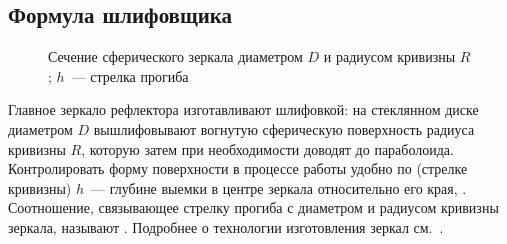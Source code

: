 \subsection{Формула шлифовщика}
\label{sec:grinder-formula}

\begin{figure}
    \centering
    \vspace{-1pc}
    \caption{Сечение сферического зеркала диаметром $D$ и радиусом кривизны $R$; $h$~--- стрелка прогиба}
    \label{pic:mirror-sagitta}
\end{figure}
Главное зеркало рефлектора изготавливают шлифовкой: на стеклянном диске диаметром $D$ вышлифовывают вогнутую сферическую поверхность радиуса кривизны $R$, которую затем при необходимости доводят до параболоида. Контролировать форму поверхности в процессе работы удобно по  (стрелке кривизны) $h$~--- глубине выемки в центре зеркала относительно его края, . Соотношение, связывающее стрелку прогиба с диаметром и радиусом кривизны зеркала, называют . Подробнее о технологии изготовления зеркал см.~\cite{sikoruk}.

